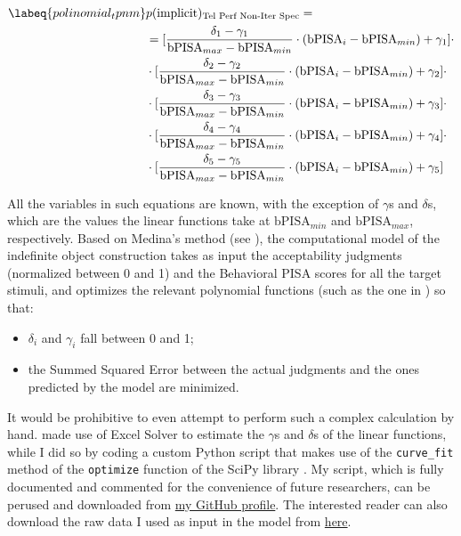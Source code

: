 \begin{align}  \labeq{polinomial_tpnm}
    & p(\text{implicit})\textsubscript{Tel Perf Non-Iter Spec} = \nonumber \\ & = [\frac{\delta_1 - \gamma_1}{\textrm{bPISA}_{max} - \textrm{bPISA}_{min}} \cdot ({\textrm{bPISA}_{i} - \textrm{bPISA}_{min}}) + \gamma_1] \cdot \nonumber \\ & \cdot [\frac{\delta_2 - \gamma_2}{\textrm{bPISA}_{max} - \textrm{bPISA}_{min}} \cdot ({\textrm{bPISA}_{i} - \textrm{bPISA}_{min}}) + \gamma_2] \cdot \nonumber \\ & \cdot [\frac{\delta_3 - \gamma_3}{\textrm{bPISA}_{max} - \textrm{bPISA}_{min}} \cdot ({\textrm{bPISA}_{i} - \textrm{bPISA}_{min}}) + \gamma_3] \cdot \nonumber \\ & \cdot [\frac{\delta_4 - \gamma_4}{\textrm{bPISA}_{max} - \textrm{bPISA}_{min}} \cdot ({\textrm{bPISA}_{i} - \textrm{bPISA}_{min}}) + \gamma_4] \cdot \nonumber \\ & \cdot [\frac{\delta_5 - \gamma_5}{\textrm{bPISA}_{max} - \textrm{bPISA}_{min}} \cdot ({\textrm{bPISA}_{i} - \textrm{bPISA}_{min}}) + \gamma_5]
\end{align}

All the variables in such equations are known, with the exception of $\gamma$s and $\delta$s, which are the values the linear functions take at $\textrm{bPISA}_{min}$ and $\textrm{bPISA}_{max}$, respectively. Based on Medina's method (see ), the computational model of the indefinite object construction takes as input the acceptability judgments (normalized between 0 and 1) and the Behavioral PISA scores for all the target stimuli, and optimizes the relevant polynomial functions (such as the one in ) so that:

\begin{itemize}
    \item $\delta_i$ and $\gamma_i$ fall between 0 and 1;
    \item the Summed Squared Error between the actual judgments and the ones predicted by the model are minimized.
\end{itemize}

It would be prohibitive to even attempt to perform such a complex calculation by hand. \textcite[135]{Medina2007} made use of Excel Solver to estimate the $\gamma$s and $\delta$s of the linear functions, while I did so by coding a custom Python script that makes use of the \texttt{curve\_fit} method of the \texttt{optimize} function of the SciPy library \parencite{2020SciPy-NMeth}. My script, which is fully documented and commented for the convenience of future researchers, can be perused and downloaded from \href{https://github.com/giuliacappelli/MedinaStochasticOptimalityTheory}{my GitHub profile}. The interested reader can also download the raw data I used as input in the model from \href{https://github.com/giuliacappelli/dissertationData}{here}.


